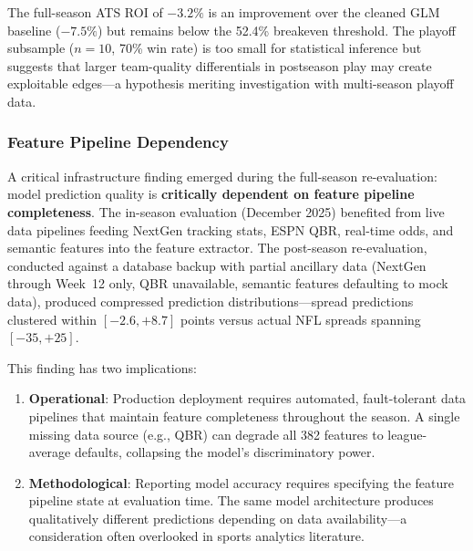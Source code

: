 The full-season ATS ROI of $-3.2\%$ is an improvement over the cleaned GLM baseline ($-7.5\%$) but remains below the 52.4\% breakeven threshold. The playoff subsample ($n=10$, 70\% win rate) is too small for statistical inference but suggests that larger team-quality differentials in postseason play may create exploitable edges---a hypothesis meriting investigation with multi-season playoff data.

\subsubsection{Feature Pipeline Dependency}

A critical infrastructure finding emerged during the full-season re-evaluation: model prediction quality is \textbf{critically dependent on feature pipeline completeness}. The in-season evaluation (December 2025) benefited from live data pipelines feeding NextGen tracking stats, ESPN QBR, real-time odds, and semantic features into the feature extractor. The post-season re-evaluation, conducted against a database backup with partial ancillary data (NextGen through Week~12 only, QBR unavailable, semantic features defaulting to mock data), produced compressed prediction distributions---spread predictions clustered within $[-2.6, +8.7]$ points versus actual NFL spreads spanning $[-35, +25]$.

This finding has two implications:
\begin{enumerate}
  \item \textbf{Operational}: Production deployment requires automated, fault-tolerant data pipelines that maintain feature completeness throughout the season. A single missing data source (e.g., QBR) can degrade all 382 features to league-average defaults, collapsing the model's discriminatory power.
  \item \textbf{Methodological}: Reporting model accuracy requires specifying the feature pipeline state at evaluation time. The same model architecture produces qualitatively different predictions depending on data availability---a consideration often overlooked in sports analytics literature.
\end{enumerate}
